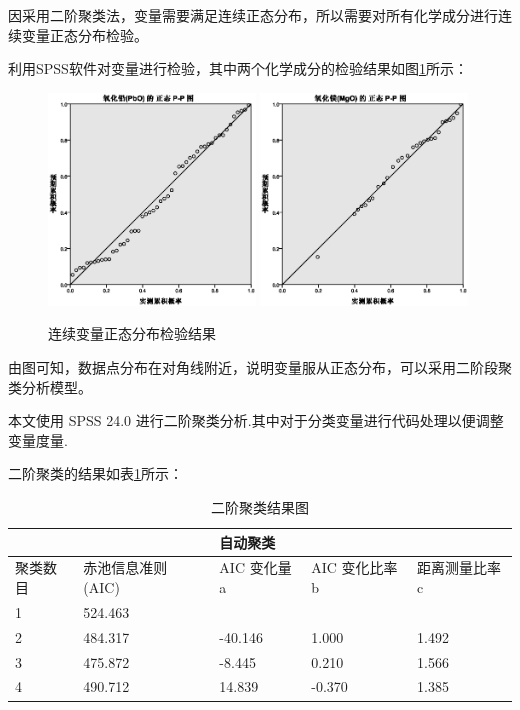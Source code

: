 \documentclass{my_paper}
\begin{document}
因采用二阶聚类法，变量需要满足连续正态分布，所以需要对所有化学成分进行连续变量正态分布检验。\par
利用SPSS软件对变量进行检验，其中两个化学成分的检验结果如图\ref{正态分布检验}所示：\\
\begin{figure}[H]
\centering
\includegraphics[width=0.49\textwidth]{PbO.eps}
\includegraphics[width=0.49\textwidth]{MgO.eps}
\caption{连续变量正态分布检验结果}
\label{正态分布检验}
\end{figure}

由图可知，数据点分布在对角线附近，说明变量服从正态分布，可以采用二阶段聚类分析模型。

本文使用 SPSS 24.0 进行二阶聚类分析.其中对于分类变量进行代码处理以便调整变量度量.

二阶聚类的结果如表\ref{二阶聚类结果图}所示：\\
\begin{table}[H]
    \centering
    \caption{二阶聚类结果图}
    \label{二阶聚类结果图}
    \begin{tabular}{lllll}
    \hline
   &   &  自动聚类   & ~ & ~ \\ \hline
        聚类数目 & 赤池信息准则 (AIC) & AIC 变化量a & AIC 变化比率b & 距离测量比率c \\ 
        1 & 524.463 & ~ & ~ & ~ \\ 
        2 & 484.317 & -40.146 & 1.000 & 1.492 \\
        3 & 475.872 & -8.445 & 0.210 & 1.566 \\ 
        4 & 490.712 & 14.839 & -0.370 & 1.385 \\ \hline
    \end{tabular}
\end{table}
\end{document}
